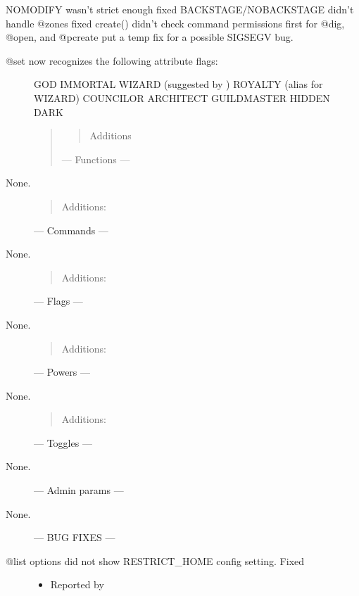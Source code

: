 \documentclass[letterpaper,10pt,english]{sphinxmanual}
\begin{document}
\sphinxAtStartPar
NOMODIFY wasn’t strict enough \sphinxhyphen{} fixed
BACKSTAGE/NOBACKSTAGE didn’t handle @zones \sphinxhyphen{} fixed
create() didn’t check command permissions first for @dig, @open, and @pcreate
put a temp fix for a possible SIGSEGV bug.
\begin{description}
\item[{@set now recognizes the following attribute flags:}] \leavevmode
\sphinxAtStartPar
GOD
IMMORTAL
WIZARD (suggested by )
ROYALTY (alias for WIZARD)
COUNCILOR
ARCHITECT
GUILDMASTER
HIDDEN
DARK
\begin{quote}
\begin{quote}

\sphinxAtStartPar
Additions
\end{quote}

\sphinxAtStartPar
— Functions —
\end{quote}

\item[{None.}] \leavevmode\begin{quote}

\sphinxAtStartPar
Additions:
\end{quote}

\sphinxAtStartPar
— Commands —

\item[{None.}] \leavevmode\begin{quote}

\sphinxAtStartPar
Additions:
\end{quote}

\sphinxAtStartPar
— Flags —

\item[{None.}] \leavevmode\begin{quote}

\sphinxAtStartPar
Additions:
\end{quote}

\sphinxAtStartPar
— Powers —

\item[{None.}] \leavevmode\begin{quote}

\sphinxAtStartPar
Additions:
\end{quote}

\sphinxAtStartPar
— Toggles —

\item[{None.}] \leavevmode
\sphinxAtStartPar
— Admin params —

\item[{None.}] \leavevmode
\sphinxAtStartPar
— BUG FIXES —

\item[{@list options did not show RESTRICT\_HOME config setting.  Fixed}] \leavevmode\begin{itemize}
\item {} 
\sphinxAtStartPar
Reported by 

\end{itemize}

\end{description}
\end{document}
